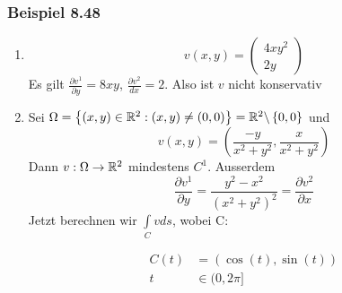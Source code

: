 \subsubsection*{Beispiel 8.48}
\begin{enumerate}
\item \[v\left( {x,y} \right) = \left( {\begin{array}{*{20}{c}}
{4x{y^2}}\\
{2y}
\end{array}} \right)\]
Es gilt $\frac{\partial v^1}{\partial y}=8xy$, $\frac{\partial v^2}{dx}=2$. Also ist $v$ nicht konservativ
\item Sei $\Omega = \left\{ \left( x,y\right) \in\mathbb{R}^2:\left( x,y\right) \not= (0,0) \right\} = \mathbb{R}^2\backslash\left\{ 0,0\right\}$ und \[v(x,y) = \left( {\frac{{ - y}}{{{x^2} + {y^2}}},\frac{x}{{{x^2} + {y^2}}}} \right)\] Dann $v:\Omega \to\mathbb{R}^2$ mindestens $C^1$. Ausserdem \[\frac{{\partial v^1}}{{\partial y}} = \frac{{{y^2} - {x^2}}}{{{{\left( {{x^2} + {y^2}} \right)}^2}}} = \frac{{\partial {v^2}}}{{\partial x}}\] Jetzt berechnen wir $\int\limits_C v ds$, wobei C:

\begin{multicols}{2}
\begin{center}
\end{center}
\columnbreak
\null\vfill
\begin{align*}
C(t)&=\left( \cos(t),\sin(t)\right)\\
t&\in(0,2\pi]
\end{align*}
\null\vfill
\end{multicols}




\end{enumerate}
